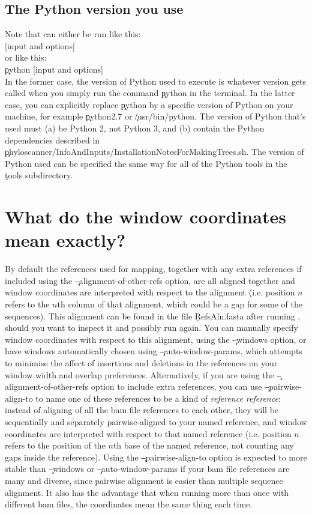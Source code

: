 \subsection{The Python version you use}
Note that \pmt can either be run like this:\\
\pmt\c{ [input and options]}\\
or like this:\\
\c{python }\pmt\c{ [input and options]}\\
In the former case, the version of Python used to execute \pmt is whatever version gets called when you simply run the command \c{python} in the terminal.
In the latter case, you can explicitly replace \c{python} by a specific version of Python on your machine, for example \c{python2.7} or \c{/usr/bin/python}.
The version of Python that's used must (a) be Python 2, not Python 3, and (b) contain the Python dependencies described in \mbox{\c{phyloscanner/InfoAndInputs/InstallationNotesForMakingTrees.sh}}.
The version of Python used can be specified the same way for all of the Python tools in the \c{tools} subdirectory.

\section{What do the window coordinates mean exactly?} \label{sec:CoordMeaning}
By default the references used for mapping, together with any extra references if included using the \c{--alignment-of-other-refs} option, are all aligned together and window coordinates are interpreted with respect to the alignment (i.e. position $n$ refers to the $n$th column of that alignment, which could be a gap for some of the sequences).
This alignment can be found in the file \c{RefsAln.fasta} after running \pmt, should you want to inspect it and possibly run again.
You can manually specify window coordinates with respect to this alignment, using the \c{--windows} option, or have windows automatically chosen using \c{--auto-window-params}, which attempts to minimise the affect of insertions and deletions in the references on your window width and overlap preferences.
Alternatively, if you are using the \c{--alignment-of-other-refs} option to include extra references, you can use \c{--pairwise-align-to} to name one of these references to be a kind of {\it reference reference}: instead of aligning of all the bam file references to each other, they will be sequentially and separately pairwise-aligned to your named reference, and window coordinates are interpreted with respect to that named reference (i.e. position $n$ refers to the position of the $n$th base of the named reference, not counting any gaps inside the reference).
Using the \c{--pairwise-align-to} option is expected to more stable than \c{--windows} or \c{--auto-window-params} if your bam file references are many and diverse, since pairwise alignment is easier than multiple sequence alignment.
It also has the advantage that when running \pmt more than once with different bam files, the coordinates mean the same thing each time.


